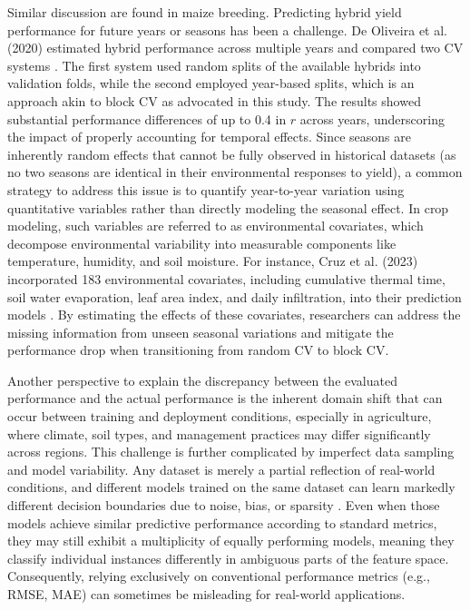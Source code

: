 Similar discussion are found in maize breeding. Predicting hybrid yield performance for future years or seasons has been a challenge. De Oliveira et al. (2020) estimated hybrid performance across multiple years and compared two CV systems \citep{de_oliveira_genomic_2020}. The first system used random splits of the available hybrids into validation folds, while the second employed year-based splits, which is an approach akin to block CV as advocated in this study. The results showed substantial performance differences of up to 0.4 in $r$ across years, underscoring the impact of properly accounting for temporal effects. Since seasons are inherently random effects that cannot be fully observed in historical datasets (as no two seasons are identical in their environmental responses to yield), a common strategy to address this issue is to quantify year-to-year variation using quantitative variables rather than directly modeling the seasonal effect. In crop modeling, such variables are referred to as environmental covariates, which decompose environmental variability into measurable components like temperature, humidity, and soil moisture. For instance, Cruz et al. (2023) incorporated 183 environmental covariates, including cumulative thermal time, soil water evaporation, leaf area index, and daily infiltration, into their prediction models \citep{lopez-cruz_leveraging_2023}. By estimating the effects of these covariates, researchers can address the missing information from unseen seasonal variations and mitigate the performance drop when transitioning from random CV to block CV.

Another perspective to explain the discrepancy between the evaluated performance and the actual performance is the inherent domain shift that can occur between training and deployment conditions, especially in agriculture, where climate, soil types, and management practices may differ significantly across regions. This challenge is further complicated by imperfect data sampling and model variability. Any dataset is merely a partial reflection of real-world conditions, and different models trained on the same dataset can learn markedly different decision boundaries due to noise, bias, or sparsity \citep{renard_understanding_2024}. Even when those models achieve similar predictive performance according to standard metrics, they may still exhibit a multiplicity of equally performing models, meaning they classify individual instances differently in ambiguous parts of the feature space. Consequently, relying exclusively on conventional performance metrics (e.g., RMSE, MAE) can sometimes be misleading for real-world applications.

